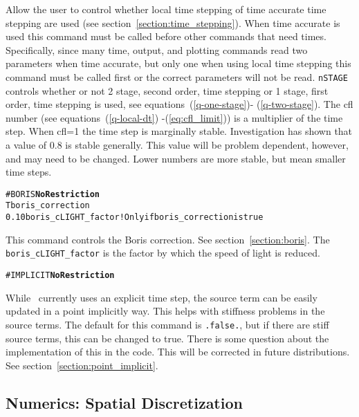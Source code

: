 Allow the user to control whether local time stepping of time accurate
time stepping are used (see section~\ref{section:time_stepping}).
When time accurate is used this command must
be called before other commands that need times.  Specifically, since
many time, output, and plotting commands read two parameters when time
accurate, but only one when using local time stepping this command
must be called first or the correct parameters will not be read.
{\tt nSTAGE} controls whether or not 2 stage, second order, time stepping
or 1 stage, first order, time stepping is used, see equations~(\ref{q-one-stage})-
(\ref{q-two-stage}).  The cfl number 
(see equations~(\ref{q-local-dt}) -(\ref{eq:cfl_limit}))
is
a multiplier of the time step.  When cfl=1 the time step is marginally
stable.  Investigation has shown that a value of 0.8 is stable generally.
This value will be problem dependent, however, and may need to be changed.
Lower numbers are more stable, but mean smaller time steps. 
\ \ \\

\begin{alltt}
#BORIS   \hfill    {\bf No Restriction}
T                      boris_correction
0.10                   boris_cLIGHT_factor !Only if boris_correction is true
\end{alltt}

This command controls the Boris correction.  See section~\ref{section:boris}.
The {\tt boris\_cLIGHT\_factor} is the factor by which the speed of light is
reduced.
\ \ \\


\begin{alltt}
#IMPLICIT \hfill {\bf No Restriction}
\end{alltt}

While \BATSRUS\ currently uses an explicit time step, the source term
can be easily updated in a point implicitly way.  This helps with stiffness
problems in the source terms.  The default for this command is {\tt .false.},
but if there are stiff source terms, this can be changed to true.  There
is some question about the implementation of this in the code.  This will
be corrected in future distributions. See section~\ref{section:point_implicit}.
\ \ \\


\subsection{Numerics: Spatial Discretization \label{section:space}}

